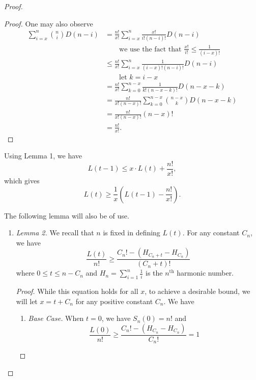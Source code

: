 \documentclass[12pt, a4paper]{article}
\newcommand{\nth}{^{\text{th}}}       %
\begin{document}
\begin{proof}
\begin{enumerate}[label=]
\begin{proof}
				One may also observe
				\begin{align*}
					\sum_{i=x}^n\binom{n}{i}D(n-i) & =
					\frac{n!}{x!}\sum_{i=x}^{n}\frac{x!}{i!(n-i)!}D(n-i)\\
					& \qquad\text{we use the fact that }\frac{x!}{i!}\le\frac{1}{(i-x)!}\\
					& \le \frac{n!}{x!}\sum_{i=x}^{n}\frac{1}{(i-x)!(n-i)!}D(n-i)\\
					& \qquad\text{let $k=i-x$}\\
					& = \frac{n!}{x!}\sum_{k=0}^{n-x}\frac{1}{k!(n-x-k)!}D(n-x-k)\\
					& = \frac{n!}{x!(n-x)!}\sum_{k=0}^{n-x}\binom{n-x}{k}D(n-x-k)\\
					& = \frac{n!}{x!(n-x)!}(n-x)!\\
					& = \frac{n!}{x!}.
				\end{align*}
			\end{proof}
		\end{enumerate}
		
		Using Lemma 1, we have
		\begin{equation*}
			L(t-1) \le x\cdot L(t) + \frac{n!}{x!},
		\end{equation*}
		which gives
		\begin{equation*}
			L(t)\ge \frac{1}{x}\left(L(t-1)-\frac{n!}{x!}\right).
		\end{equation*}
		
		The following lemma will also be of use.
		\begin{enumerate}[label=]
			\item\textit{Lemma 2.} We recall that $n$ is fixed in defining $L(t)$. For any constant $C_n$, we have
			\begin{equation*}
				\frac{L(t)}{n!}\ge \frac{C_{n}! - (H_{C_{n}+t} - H_{C_{n}})}{(C_n+t)!}
			\end{equation*}
			where $0\le t\le n-C_{n}$ and $H_n=\sum_{i = 1}^n\frac{1}{i}$ is the $n\nth$ harmonic number.
		\begin{proof}
			While this equation holds for all $x$, to achieve a desirable bound, we will
		let $x=t+C_{n}$ for any positive constant $C_{n}$. We have
		\begin{enumerate}[label=]
		\item\textit{Base Case.} When $t=0$, we have $S_n(0)= n!$ and
			\begin{equation*}
			\frac{L(0)}{n!}\ge \frac{C_{n}! - (H_{C_{n}}-H_{C_{n}})}{C_{n}!} = 1
			\end{equation*}
			

\end{enumerate}
\end{proof}
\end{enumerate}
\end{proof}
\end{document}
